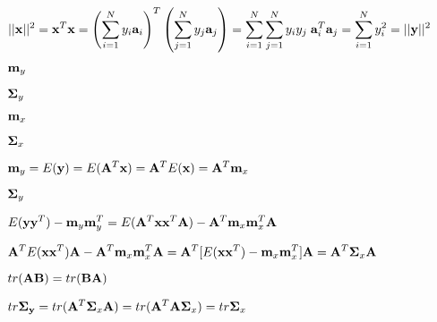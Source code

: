 \documentclass{article}
\def\lthtmlcheckvsize{\ifdim\ht\sizebox<\vsize 
  \ifdim\wd\sizebox<\hsize\expandafter\hfill\fi \expandafter\vfill
  \else\expandafter\vss\fi}%
\begin{document}
{\newpage\clearpage
{}%
$\displaystyle ||{\bf x}||^2={\bf x}^T{\bf x}=\left(\sum_{i=1}^{N} y_i {\bf a}_i\right)^T
\left(\sum_{j=1}^{N} y_j {\bf a}_j \right)
=\sum_{i=1}^N \sum_{j=1}^N y_iy_j \;{\bf a}_i^T{\bf a}_j
=\sum_{i=1}^Ny_i^2=||{\bf y}||^2$%
\lthtmlindisplaymathZ
\lthtmlcheckvsize\clearpage}

{\newpage\clearpage
{}%
$ {\bf m}_y$%
\lthtmlindisplaymathZ
\lthtmlcheckvsize\clearpage}

{\newpage\clearpage
{}%
$ {\bf\Sigma}_y$%
\lthtmlindisplaymathZ
\lthtmlcheckvsize\clearpage}

{\newpage\clearpage
{}%
$ {\bf m}_x$%
\lthtmlindisplaymathZ
\lthtmlcheckvsize\clearpage}

{\newpage\clearpage
{}%
$ {\bf\Sigma}_x$%
\lthtmlindisplaymathZ
\lthtmlcheckvsize\clearpage}

{\newpage\clearpage
{}%
$\displaystyle {\bf m}_y=E({\bf y})=E({\bf A}^T{\bf x})={\bf A}^TE({\bf x})
={\bf A}^T{\bf m}_x$%
\lthtmlindisplaymathZ
\lthtmlcheckvsize\clearpage}

{\newpage\clearpage
{}%
$\displaystyle {\bf\Sigma}_y$%
\lthtmlindisplaymathZ
\lthtmlcheckvsize\clearpage}

{\newpage\clearpage
{}%
$\displaystyle E({\bf yy}^T)-{\bf m}_y{\bf m}_y^T
=E({\bf A}^T{\bf xx}^T{\bf A})-{\bf A}^T{\bf m}_x{\bf m}_x^T{\bf A}$%
\lthtmlindisplaymathZ
\lthtmlcheckvsize\clearpage}

{\newpage\clearpage
{}%
$\displaystyle {\bf A}^TE({\bf xx}^T){\bf A}-{\bf A}^T{\bf m}_x{\bf m}_x^T{\bf A}
={\bf A}^T[E({\bf xx}^T)-{\bf m}_x{\bf m}_x^T]{\bf A}
={\bf A}^T{\bf\Sigma}_x{\bf A}$%
\lthtmlindisplaymathZ
\lthtmlcheckvsize\clearpage}

{\newpage\clearpage
{}%
$ tr({\bf AB})=tr({\bf BA})$%
\lthtmlindisplaymathZ
\lthtmlcheckvsize\clearpage}

{\newpage\clearpage
{}%
$\displaystyle tr {\bf\Sigma_y}=tr ({\bf A}^T{\bf\Sigma}_x{\bf A})
=tr ({\bf A}^T{\bf A}{\bf\Sigma}_x)=tr {\bf\Sigma}_x$%
\lthtmlindisplaymathZ
\lthtmlcheckvsize\clearpage}
\end{document}
